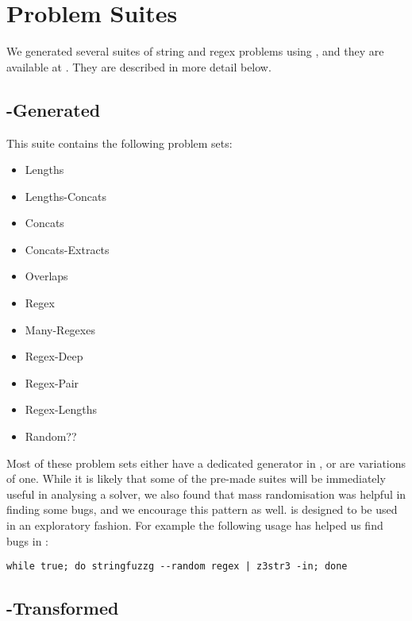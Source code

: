 \section{Problem Suites}

    We generated several suites of string and regex problems using \fuzzer{}, and they are available at \problemRepo{}. They are described in more detail below.

    \subsection{\fuzzer{}-Generated}

        This suite contains the following problem sets:

        \begin{itemize}
            \item Lengths
            \item Lengths-Concats
            \item Concats
            \item Concats-Extracts
            \item Overlaps
            \item Regex
            \item Many-Regexes
            \item Regex-Deep
            \item Regex-Pair
            \item Regex-Lengths
            \item Random??
        \end{itemize}

        Most of these problem sets either have a dedicated generator in \generator{}, or are variations of one. While it is likely that some of the pre-made suites will be immediately useful in analysing a solver, we also found that mass randomisation was helpful in finding some bugs, and we encourage this pattern as well. \generator{} is designed to be used in an exploratory fashion. For example the following usage has helped us find bugs in \us{}:

\begin{verbatim}
while true; do stringfuzzg --random regex | z3str3 -in; done
\end{verbatim}

    \subsection{\fuzzer{}-Transformed}

